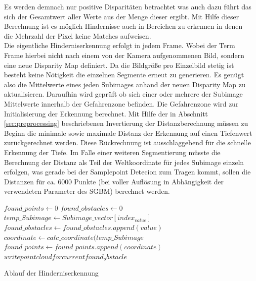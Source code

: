 \noindent
Es werden demnach nur positive Disparitäten betrachtet was auch dazu führt das sich der Gesamtwert aller Werte aus der Menge dieser ergibt. Mit Hilfe dieser Berechnung ist es möglich Hindernisse auch in Bereichen zu erkennen in denen die Mehrzahl der Pixel keine Matches aufweisen.\\

\noindent
Die eigentliche Hinderniserkennung erfolgt in jedem Frame. Wobei der Term Frame hierbei nicht nach einem von der Kamera aufgenommenen Bild, sondern eine neue Disparity Map definiert. Da die Bildgröße pro Einzelbild stetig ist besteht keine Nötigkeit die einzelnen Segmente erneut zu generieren. Es genügt also die Mittelwerte eines jeden Subimages anhand der neuen Disparity Map zu aktualisieren. Daraufhin wird geprüft ob sich einer oder mehrere der Subimage Mittelwerte innerhalb der Gefahrenzone befinden. Die Gefahrenzone wird zur Initialisierung der Erkennung berechnet. Mit Hilfe der in Abschnitt \ref{sec:preprocessing} beschriebenen Invertierung der Distanzberechnung müssen zu Beginn die minimale sowie maximale Distanz der Erkennung auf einen Tiefenwert zurückgerechnet werden. Diese Rückrechnung ist ausschlaggebend für die schnelle Erkennung der Tiefe. Im Falle einer weiteren Segmentierung müsste die Berechnung der Distanz als Teil der Weltkoordinate für jedes Subimage einzeln erfolgen, was gerade bei der Samplepoint Detecion zum Tragen kommt, sollen die Distanzen für ca. $6000$ Punkte (bei voller Auflösung in Abhängigkeit der verwendeten Parameter des SGBM) berechnet werden.\\

\begin{algorithm}[h]
\label{alg:mean_disparity_detection}
\begin{algorithmic}[1]
		\State $found\_points \gets 0$
		\State $found\_obstacles \gets 0$
				\State $temp\_Subimage \gets Subimage\_vector[index_{value}]$
				\State $found\_obstacles \gets found\_obstacles.append(value)$
				\State $coordinate \gets calc\_coordinate(temp\_Subimage$
				\State $found\_points \gets found\_points.append(coordinate)$
			\EndIf
		\EndFor
			\State $write pointcloud for current found_obstacle$
		\EndIf 
    \EndProcedure
\end{algorithmic}
\caption{Ablauf der Hinderniserkennung}
\end{algorithm}

